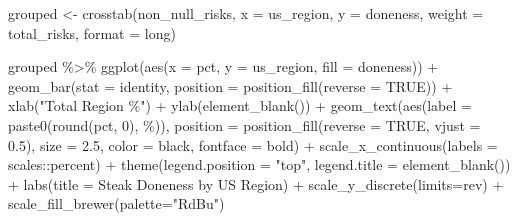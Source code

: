 \documentclass[
]{article}
\newenvironment{Shaded}{\begin{snugshade}}{\end{snugshade}}
\newcommand{\AttributeTok}[1]{\textcolor[rgb]{0.77,0.63,0.00}{#1}}
\newcommand{\ConstantTok}[1]{\textcolor[rgb]{0.00,0.00,0.00}{#1}}
\newcommand{\DecValTok}[1]{\textcolor[rgb]{0.00,0.00,0.81}{#1}}
\newcommand{\FloatTok}[1]{\textcolor[rgb]{0.00,0.00,0.81}{#1}}
\newcommand{\FunctionTok}[1]{\textcolor[rgb]{0.00,0.00,0.00}{#1}}
\newcommand{\NormalTok}[1]{#1}
\newcommand{\OtherTok}[1]{\textcolor[rgb]{0.56,0.35,0.01}{#1}}
\newcommand{\SpecialCharTok}[1]{\textcolor[rgb]{0.00,0.00,0.00}{#1}}
\newcommand{\StringTok}[1]{\textcolor[rgb]{0.31,0.60,0.02}{#1}}
\begin{document}
\begin{Shaded}
\begin{Highlighting}[]
\NormalTok{grouped }\OtherTok{\textless{}{-}} \FunctionTok{crosstab}\NormalTok{(non\_null\_risks, }\AttributeTok{x =}\NormalTok{ us\_region, }\AttributeTok{y =}\NormalTok{ doneness, }\AttributeTok{weight =}\NormalTok{ total\_risks, }\AttributeTok{format =} \StringTok{\textquotesingle{}long\textquotesingle{}}\NormalTok{)}

\NormalTok{grouped }\SpecialCharTok{\%\textgreater{}\%} 
  \FunctionTok{ggplot}\NormalTok{(}\FunctionTok{aes}\NormalTok{(}\AttributeTok{x =}\NormalTok{ pct, }\AttributeTok{y =}\NormalTok{ us\_region, }\AttributeTok{fill =}\NormalTok{ doneness)) }\SpecialCharTok{+}
  \FunctionTok{geom\_bar}\NormalTok{(}\AttributeTok{stat =} \StringTok{\textquotesingle{}identity\textquotesingle{}}\NormalTok{, }\AttributeTok{position =} \FunctionTok{position\_fill}\NormalTok{(}\AttributeTok{reverse =} \ConstantTok{TRUE}\NormalTok{)) }\SpecialCharTok{+}
  \FunctionTok{xlab}\NormalTok{(}\StringTok{"Total Region \%"}\NormalTok{) }\SpecialCharTok{+}
  \FunctionTok{ylab}\NormalTok{(}\FunctionTok{element\_blank}\NormalTok{()) }\SpecialCharTok{+}
  \FunctionTok{geom\_text}\NormalTok{(}\FunctionTok{aes}\NormalTok{(}\AttributeTok{label =} \FunctionTok{paste0}\NormalTok{(}\FunctionTok{round}\NormalTok{(pct, }\DecValTok{0}\NormalTok{), }\StringTok{\textquotesingle{}\%\textquotesingle{}}\NormalTok{)), }\AttributeTok{position =} \FunctionTok{position\_fill}\NormalTok{(}\AttributeTok{reverse =} \ConstantTok{TRUE}\NormalTok{, }\AttributeTok{vjust =} \FloatTok{0.5}\NormalTok{), }\AttributeTok{size =} \FloatTok{2.5}\NormalTok{, }\AttributeTok{color =} \StringTok{\textquotesingle{}black\textquotesingle{}}\NormalTok{, }\AttributeTok{fontface =} \StringTok{\textquotesingle{}bold\textquotesingle{}}\NormalTok{) }\SpecialCharTok{+}
  \FunctionTok{scale\_x\_continuous}\NormalTok{(}\AttributeTok{labels =}\NormalTok{ scales}\SpecialCharTok{::}\NormalTok{percent) }\SpecialCharTok{+}
 \FunctionTok{theme}\NormalTok{(}\AttributeTok{legend.position =} \StringTok{"top"}\NormalTok{, }\AttributeTok{legend.title =} \FunctionTok{element\_blank}\NormalTok{()) }\SpecialCharTok{+}
  \FunctionTok{labs}\NormalTok{(}\AttributeTok{title =} \StringTok{\textquotesingle{}Steak Doneness by US Region\textquotesingle{}}\NormalTok{) }\SpecialCharTok{+}
  \FunctionTok{scale\_y\_discrete}\NormalTok{(}\AttributeTok{limits=}\NormalTok{rev) }\SpecialCharTok{+}
  \FunctionTok{scale\_fill\_brewer}\NormalTok{(}\AttributeTok{palette=}\StringTok{"RdBu"}\NormalTok{)}
\end{Highlighting}
\end{Shaded}
\end{document}
